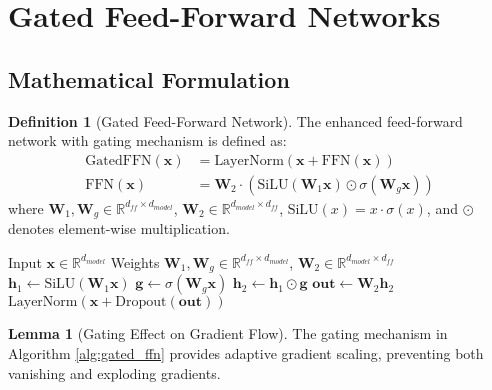 \documentclass[12pt]{article}
\theoremstyle{definition}
\newtheorem{definition}{Definition}
\newtheorem{lemma}{Lemma}
\begin{document}
\section{Gated Feed-Forward Networks}

\subsection{Mathematical Formulation}

\begin{definition}[Gated Feed-Forward Network]
The enhanced feed-forward network with gating mechanism is defined as:
\begin{align}
\text{GatedFFN}(\mathbf{x}) &= \text{LayerNorm}(\mathbf{x} + \text{FFN}(\mathbf{x})) \\
\text{FFN}(\mathbf{x}) &= \mathbf{W}_2 \cdot (\text{SiLU}(\mathbf{W}_1 \mathbf{x}) \odot \sigma(\mathbf{W}_g \mathbf{x}))
\end{align}
where $\mathbf{W}_1, \mathbf{W}_g \in \mathbb{R}^{d_{ff} \times d_{model}}$, $\mathbf{W}_2 \in \mathbb{R}^{d_{model} \times d_{ff}}$, $\text{SiLU}(x) = x \cdot \sigma(x)$, and $\odot$ denotes element-wise multiplication.
\end{definition}

\begin{algorithm}[H]
\caption{Gated Feed-Forward Network Forward Pass}
\label{alg:gated_ffn}
\begin{algorithmic}[1]
\REQUIRE Input $\mathbf{x} \in \mathbb{R}^{d_{model}}$
\REQUIRE Weights $\mathbf{W}_1, \mathbf{W}_g \in \mathbb{R}^{d_{ff} \times d_{model}}$, $\mathbf{W}_2 \in \mathbb{R}^{d_{model} \times d_{ff}}$
\STATE $\mathbf{h}_1 \leftarrow \text{SiLU}(\mathbf{W}_1 \mathbf{x})$ 
\STATE $\mathbf{g} \leftarrow \sigma(\mathbf{W}_g \mathbf{x})$ 
\STATE $\mathbf{h}_2 \leftarrow \mathbf{h}_1 \odot \mathbf{g}$ 
\STATE $\mathbf{out} \leftarrow \mathbf{W}_2 \mathbf{h}_2$ 
\RETURN $\text{LayerNorm}(\mathbf{x} + \text{Dropout}(\mathbf{out}))$
\end{algorithmic}
\end{algorithm}

\begin{lemma}[Gating Effect on Gradient Flow]
The gating mechanism in Algorithm \ref{alg:gated_ffn} provides adaptive gradient scaling, preventing both vanishing and exploding gradients.
\end{lemma}
\end{document}
